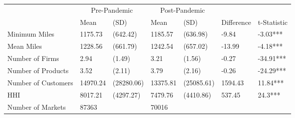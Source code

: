 
\begin{tabular}[t]{lllllll}
\toprule
\multicolumn{1}{c}{ } & \multicolumn{2}{c}{Pre-Pandemic} & \multicolumn{2}{c}{Post-Pandemic} & \multicolumn{2}{c}{ } \\
\cmidrule(l{3pt}r{3pt}){2-3} \cmidrule(l{3pt}r{3pt}){4-5}
 & Mean & (SD) & Mean & (SD) & Difference & t-Statistic\\
\midrule
Minimum Miles & 1175.73 & (642.42) & 1185.57 & (636.98) & -9.84 & -3.03***\\
Mean Miles & 1228.56 & (661.79) & 1242.54 & (657.02) & -13.99 & -4.18***\\
Number of Firms & 2.94 & (1.49) & 3.21 & (1.56) & -0.27 & -34.91***\\
Number of Products & 3.52 & (2.11) & 3.79 & (2.16) & -0.26 & -24.29***\\
Number of Customers & 14970.24 & (28280.06) & 13375.81 & (25085.61) & 1594.43 & 11.84***\\
HHI & 8017.21 & (4297.27) & 7479.76 & (4410.86) & 537.45 & 24.3***\\
Number of Markets & 87363 &  & 70016 &  &  & \\
\bottomrule
\end{tabular}
